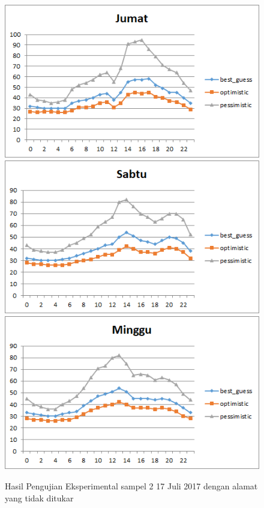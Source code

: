 \begin{figure}[H]
				\centering		
				\includegraphics[]{Gambar/jumatsampel217072017normal.png}
				\includegraphics[]{Gambar/sabtusampel217072017normal.png}
				\includegraphics[]{Gambar/minggusampel217072017normal.png}
				\caption[Hasil Pengujian Eksperimental]{Hasil Pengujian Eksperimental sampel 2 17 Juli 2017 dengan alamat yang tidak ditukar}
				\label{fig:eksperimentalsampel217072017normal}
\end{figure}
\newpage
			
